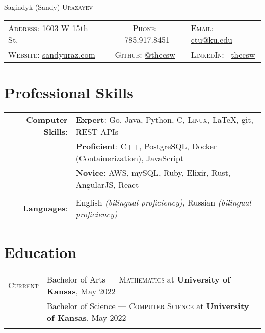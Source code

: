 \documentclass[letterpaper, 10pt]{article}
\begin{document}
\pagestyle{empty}

\par{\centering
	{\Huge Sagindyk (Sandy) \textsc{Urazayev}
	}\smallskip\par}

\begin{center}
	\begin{tabular}{lcl}
		\textsc{Address:}   1603 W 15th St.                              &
		\textsc{Phone:} \quad \ 785.917.8451                             &
		\textsc{Email:} \quad \href{mailto:ctu@ku.edu}{ctu@ku.edu}         \\

		\textsc{Website:} \href{https://sandyuraz.com}{sandyuraz.com}    &
		\textsc{Github:} \quad \href{https://github.com/thecsw}{@thecsw} &
		\textsc{LinkedIn:} \ \href{https://linkedin.com/in/thecsw}{thecsw} \\
	\end{tabular}
\end{center}

\section{Professional Skills}
\begin{tabular}{rl}
	\textbf{Computer Skills}: &
	\textbf{Expert}: Go, Java, Python, C, \textsc{Linux}, \LaTeX, git, REST APIs                               \\&
	\textbf{Proficient}: C++, PostgreSQL, Docker (Containerization), JavaScript                                \\&
	\textbf{Novice}: AWS, mySQL, Ruby, Elixir, Rust, AngularJS, React                                          \\\\

	\textbf{Languages}:       & English \emph{(bilingual proficiency)}, Russian \emph{(bilingual proficiency)} \\
\end{tabular}

\section{Education}
\begin{tabular}{rl}
  \textsc{Current} & Bachelor of Arts --- \textsc{Mathematics} at \normalsize\textbf{University of Kansas}, May 2022\\
	& Bachelor of Science --- \textsc{Computer Science} at \normalsize\textbf{University of Kansas}, May 2022\\
	\\
\end{tabular}
\end{document}
